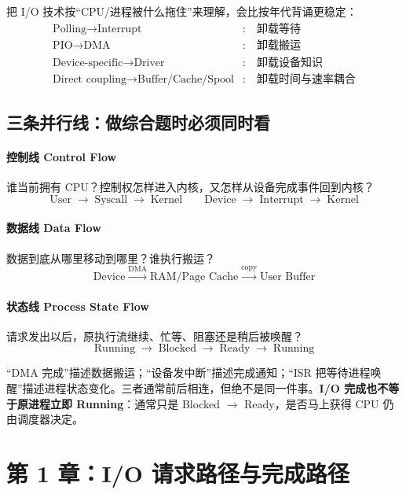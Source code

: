 \documentclass[11pt,a4paper]{ctexart}
\newcommand{\kw}[1]{\textbf{#1}}
\newcommand{\arr}{\;\longrightarrow\;}
\begin{document}
\begin{bridge}[I/O 的四次“卸载”]
把 I/O 技术按“CPU/进程被什么拖住”来理解，会比按年代背诵更稳定：
\[
\boxed{
\begin{aligned}
\text{Polling}\to\text{Interrupt} &:\quad \text{卸载等待}\\
\text{PIO}\to\text{DMA} &:\quad \text{卸载搬运}\\
\text{Device-specific}\to\text{Driver} &:\quad \text{卸载设备知识}\\
\text{Direct coupling}\to\text{Buffer/Cache/Spool} &:\quad \text{卸载时间与速率耦合}
\end{aligned}}
\]
\end{bridge}

\subsection{三条并行线：做综合题时必须同时看}

\paragraph{控制线 Control Flow}
谁当前拥有 CPU？控制权怎样进入内核，又怎样从设备完成事件回到内核？
\[
\text{User}\arr\text{Syscall}\arr\text{Kernel}\qquad
\text{Device}\arr\text{Interrupt}\arr\text{Kernel}
\]

\paragraph{数据线 Data Flow}
数据到底从哪里移动到哪里？谁执行搬运？
\[
\text{Device}\xrightarrow{\text{DMA}}\text{RAM/Page Cache}
\xrightarrow{\text{copy}}\text{User Buffer}
\]

\paragraph{状态线 Process State Flow}
请求发出以后，原执行流继续、忙等、阻塞还是稍后被唤醒？
\[
\text{Running}\arr\text{Blocked}\arr\text{Ready}\arr\text{Running}
\]

\begin{warn}[三条线最常见的混淆]
“DMA 完成”描述数据搬运；“设备发中断”描述完成通知；“ISR 把等待进程唤醒”描述进程状态变化。三者通常前后相连，但绝不是同一件事。\kw{I/O 完成也不等于原进程立即 Running}：通常只是 Blocked $\to$ Ready，是否马上获得 CPU 仍由调度器决定。
\end{warn}

\section{第 1 章：I/O 请求路径与完成路径}
\end{document}
